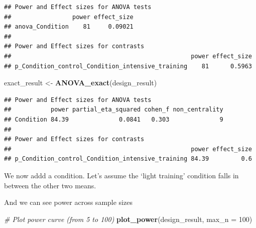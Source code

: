 \documentclass[]{book}
\newenvironment{Shaded}{\begin{snugshade}}{\end{snugshade}}
\newcommand{\CommentTok}[1]{\textcolor[rgb]{0.56,0.35,0.01}{\textit{#1}}}
\newcommand{\DataTypeTok}[1]{\textcolor[rgb]{0.13,0.29,0.53}{#1}}
\newcommand{\DecValTok}[1]{\textcolor[rgb]{0.00,0.00,0.81}{#1}}
\newcommand{\KeywordTok}[1]{\textcolor[rgb]{0.13,0.29,0.53}{\textbf{#1}}}
\newcommand{\NormalTok}[1]{#1}
\newcommand{\OperatorTok}[1]{\textcolor[rgb]{0.81,0.36,0.00}{\textbf{#1}}}
\newcommand{\StringTok}[1]{\textcolor[rgb]{0.31,0.60,0.02}{#1}}
\begin{document}
\begin{verbatim}
## Power and Effect sizes for ANOVA tests
##                 power effect_size
## anova_Condition    81     0.09021
## 
## Power and Effect sizes for contrasts
##                                                  power effect_size
## p_Condition_control_Condition_intensive_training    81      0.5963
\end{verbatim}

\begin{Shaded}
\begin{Highlighting}[]
\NormalTok{exact_result <-}\StringTok{ }\KeywordTok{ANOVA_exact}\NormalTok{(design_result)}
\end{Highlighting}
\end{Shaded}

\begin{verbatim}
## Power and Effect sizes for ANOVA tests
##           power partial_eta_squared cohen_f non_centrality
## Condition 84.39              0.0841   0.303              9
## 
## Power and Effect sizes for contrasts
##                                                  power effect_size
## p_Condition_control_Condition_intensive_training 84.39         0.6
\end{verbatim}

We now addd a condition. Let's assume the `light training' condition falls in between the other two means.

And we can see power across sample sizes

\begin{Shaded}
\begin{Highlighting}[]
\CommentTok{# Plot power curve (from 5 to 100)}
\KeywordTok{plot_power}\NormalTok{(design_result, }\DataTypeTok{max_n =} \DecValTok{100}\NormalTok{)}
\end{Highlighting}
\end{Shaded}

\begin{Shaded}
\end{Shaded}
\end{document}
